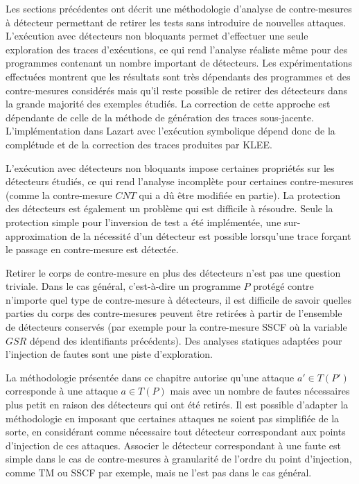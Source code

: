         Les sections précédentes ont décrit une méthodologie d'analyse de contre-mesures à détecteur permettant de retirer les tests sans introduire de nouvelles attaques.
        L'exécution avec détecteurs non bloquants permet d'effectuer une seule exploration des traces d'exécutions, ce qui rend l'analyse réaliste même pour des programmes contenant un nombre important de détecteurs. Les expérimentations effectuées montrent que les résultats sont très dépendants des programmes et des contre-mesures considérés mais qu'il reste possible de retirer des détecteurs dans la grande majorité des exemples étudiés.        
        La correction de cette approche est dépendante de celle de la méthode de génération des traces sous-jacente. L'implémentation dans Lazart avec l'exécution symbolique dépend donc de la complétude et de la correction des traces produites par KLEE.
        
        L'exécution avec détecteurs non bloquants impose certaines propriétés sur les détecteurs étudiés, ce qui rend l'analyse incomplète pour certaines contre-mesures (comme la contre-mesure $CNT$ \cite{lalande} qui a dû être modifiée en partie).        
        La protection des détecteurs est également un problème qui est difficile à résoudre. Seule la protection simple pour l'inversion de test a été implémentée, une sur-approximation de la nécessité d'un détecteur est possible lorsqu'une trace forçant le passage en contre-mesure est détectée.
        
        Retirer le corps de contre-mesure en plus des détecteurs n'est pas une question triviale.         
        Dans le cas général, c'est-à-dire un programme $P$ protégé contre n'importe quel type de contre-mesure à détecteurs, il est difficile de savoir quelles parties du corps des contre-mesures peuvent être retirées à partir de l'ensemble de détecteurs conservés (par exemple pour la contre-mesure \gls{SSCF}  où la variable $GSR$ dépend des identifiants précédents). 
        Des analyses statiques adaptées pour l'injection de fautes sont une piste d'exploration.
        
        La méthodologie présentée dans ce chapitre autorise qu'une attaque $a' \in T(P')$ corresponde à une attaque $a \in T(P)$ mais avec un nombre de fautes nécessaires plus petit en raison des détecteurs qui ont été retirés.
        Il est possible d'adapter la méthodologie en imposant que certaines attaques ne soient pas simplifiée de la sorte, en considérant comme nécessaire tout détecteur correspondant aux points d'injection de ces attaques. Associer le détecteur correspondant à une faute est simple dans le cas de contre-mesures à granularité de l'ordre du point d'injection, comme \gls{TM} ou \gls{SSCF} par exemple, mais ne l'est pas dans le cas général.  
        
